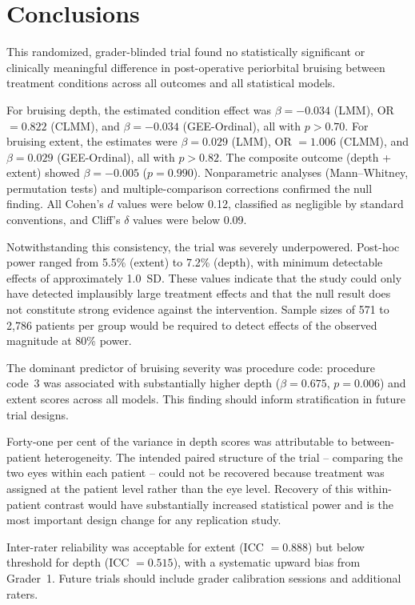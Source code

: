 \section{Conclusions}

This randomized, grader-blinded trial found no statistically significant or clinically meaningful difference in post-operative periorbital bruising between treatment conditions across all outcomes and all statistical models.

For bruising depth, the estimated condition effect was $\beta = -0.034$ (LMM), OR $= 0.822$ (CLMM), and $\beta = -0.034$ (GEE-Ordinal), all with $p > 0.70$. For bruising extent, the estimates were $\beta = 0.029$ (LMM), OR $= 1.006$ (CLMM), and $\beta = 0.029$ (GEE-Ordinal), all with $p > 0.82$. The composite outcome (depth + extent) showed $\beta = -0.005$ ($p = 0.990$). Nonparametric analyses (Mann--Whitney, permutation tests) and multiple-comparison corrections confirmed the null finding. All Cohen's $d$ values were below 0.12, classified as negligible by standard conventions, and Cliff's $\delta$ values were below 0.09.

Notwithstanding this consistency, the trial was severely underpowered. Post-hoc power ranged from 5.5\% (extent) to 7.2\% (depth), with minimum detectable effects of approximately 1.0~SD. These values indicate that the study could only have detected implausibly large treatment effects and that the null result does not constitute strong evidence against the intervention. Sample sizes of 571 to 2{,}786 patients per group would be required to detect effects of the observed magnitude at 80\% power.

The dominant predictor of bruising severity was procedure code: procedure code~3 was associated with substantially higher depth ($\beta = 0.675$, $p = 0.006$) and extent scores across all models. This finding should inform stratification in future trial designs.

Forty-one per cent of the variance in depth scores was attributable to between-patient heterogeneity. The intended paired structure of the trial -- comparing the two eyes within each patient -- could not be recovered because treatment was assigned at the patient level rather than the eye level. Recovery of this within-patient contrast would have substantially increased statistical power and is the most important design change for any replication study.

Inter-rater reliability was acceptable for extent (ICC $= 0.888$) but below threshold for depth (ICC $= 0.515$), with a systematic upward bias from Grader~1. Future trials should include grader calibration sessions and additional raters.

